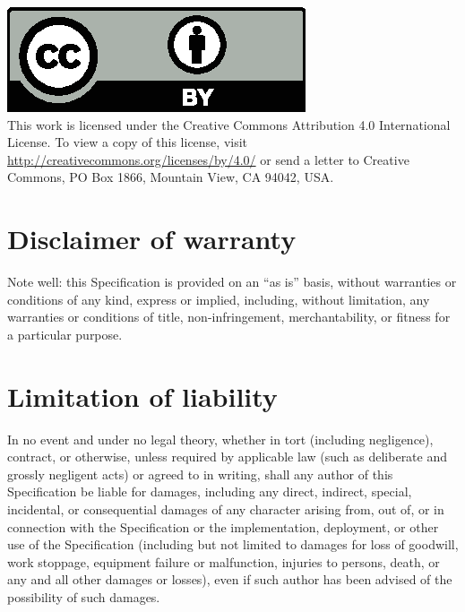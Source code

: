 \documentclass{uavcandoc}
\begin{document}
\begin{titlepage}
\hspace*{\fill}\includegraphics[height=2\baselineskip]{cc-by}\hspace*{\fill}\\
This work is licensed under the Creative Commons Attribution 4.0 International License.
To view a copy of this license, visit \url{http://creativecommons.org/licenses/by/4.0/}
or send a letter to Creative Commons, PO Box 1866, Mountain View, CA 94042, USA.

\section*{Disclaimer of warranty}

Note well: this Specification is provided on an ``as is'' basis, without warranties or conditions of any kind,
express or implied, including, without limitation, any warranties or conditions of
title, non-infringement, merchantability, or fitness for a particular purpose.

\section*{Limitation of liability}

In no event and under no legal theory, whether in tort (including negligence), contract, or otherwise,
unless required by applicable law (such as deliberate and grossly negligent acts) or agreed to in writing,
shall any author of this Specification be liable for damages,
including any direct, indirect, special, incidental, or consequential damages of any character arising
from, out of, or in connection with the Specification or the implementation, deployment,
or other use of the Specification
(including but not limited to damages for loss of goodwill, work stoppage, equipment failure or malfunction,
injuries to persons, death, or any and all other damages or losses),
even if such author has been advised of the possibility of such damages.

\end{titlepage}

\tableofcontents
\clearpage\onecolumn\listoftables
\clearpage\onecolumn\listoffigures

\mainmatter








\end{document}
